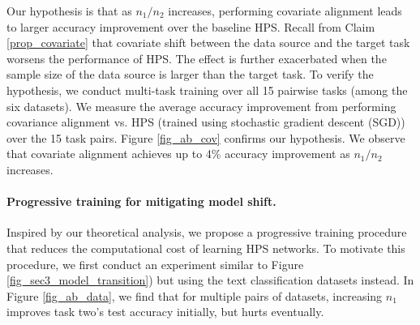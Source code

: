 Our hypothesis is that as $n_1 / n_2$ increases, performing covariate alignment leads to larger accuracy improvement over the baseline HPS.
Recall from Claim \ref{prop_covariate} that covariate shift between the data source and the target task worsens the performance of HPS.
The effect is further exacerbated when the sample size of the data source is larger than the target task.
To verify the hypothesis, we conduct multi-task training over all 15 pairwise tasks (among the six datasets).
We measure the average accuracy improvement from performing covariance alignment vs. HPS (trained using stochastic gradient descent (SGD)) over the 15 task pairs.
Figure \ref{fig_ab_cov} confirms our hypothesis.
We observe that covariate alignment achieves up to 4\% accuracy improvement as $n_1 / n_2$ increases.



\paragraph{Progressive training for mitigating model shift.}
Inspired by our theoretical analysis, we propose a progressive training procedure that reduces the computational cost of learning HPS networks.
To motivate this procedure, we first conduct an experiment similar to Figure \ref{fig_sec3_model_transition}) but using the text classification datasets instead.
In Figure \ref{fig_ab_data}, we find that for multiple pairs of datasets, increasing $n_1$ improves task two's test accuracy initially, but hurts eventually.

